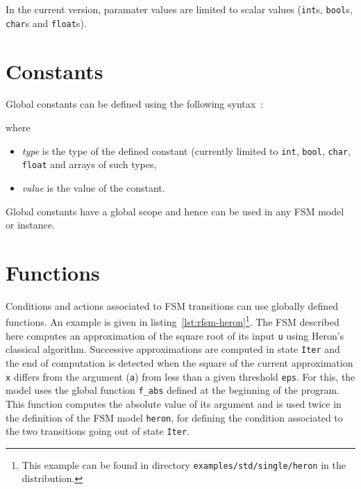 \medskip
In the current version, paramater values are limited to scalar values (\texttt{int}s,
\texttt{bool}s, \texttt{char}s and \texttt{float}s). 




\section{Constants}
\label{sec:constants}

Global constants can be defined using the following syntax~:  

\begin{center}
\end{center}

\noindent
where
\begin{itemize}
\item \emph{type} is the type of the defined constant (currently limited to
  \verb|int|, \verb|bool|, \verb|char|, \verb|float| and arrays of such types,
\item \emph{value} is the value of the constant.
\end{itemize}

Global constants have a global scope and hence can be used in any FSM model or instance.

\section{Functions}
\label{sec:functions}

Conditions and actions associated to FSM transitions can use globally defined functions. An example
is given in listing~\ref{lst:rfsm-heron}\footnote{This example can be found in directory
  \texttt{examples/std/single/heron} in the distribution.}. The FSM described here computes an approximation
of the square root of its input \verb|u| using Heron's classical algorithm. Successive approximations are computed in
state \verb|Iter| and the end of computation is detected when the square of the current
approximation \verb|x| differs from the argument (\verb|a|) from less than a given threshold
\verb|eps|. For this, the model uses the global function \verb|f_abs| defined at the beginning of
the program. This function computes the absolute value of its argument and is used twice in the
definition of the FSM model \verb|heron|, for defining the condition associated to the two
transitions going out of state \verb|Iter|.

